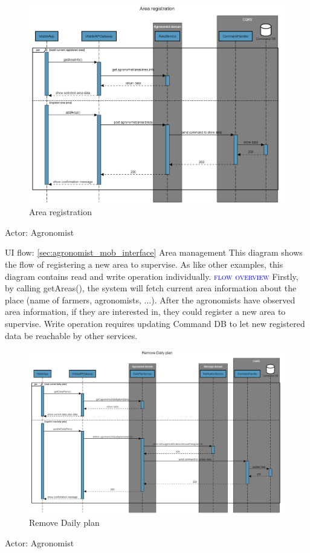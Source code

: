 \newpage
\begin{figure}[H]
	\centering
    \includegraphics[width=\textwidth]{Images/sequence-diagram/area-registration.png}
	\caption{\label{fig:se_area}Area registration}
\end{figure}
Actor: Agronomist

UI flow: {\ref{sec:agronomist_mob_interface} Area management}
\newline
\newline
This diagram shows the flow of registering a new area to supervise. As like other examples, this diagram contains read and write operation individually.
\newline
\newline
\textsc{\textcolor{blue}{flow overview}}
\newline
Firstly, by calling getAreas(), the system will fetch current area information about the place (name of farmers, agronomists, ...). After the agronomists have observed area information, if they are interested in, they could register a new area to supervise. Write operation requires updating Command DB to let new registered data be reachable by other services.

\newpage
\begin{figure}[H]
	\centering
    \includegraphics[width=\textwidth]{Images/sequence-diagram/daily-plan.png}
	\caption{\label{fig:se_daily}Remove Daily plan}
\end{figure}
Actor: Agronomist

